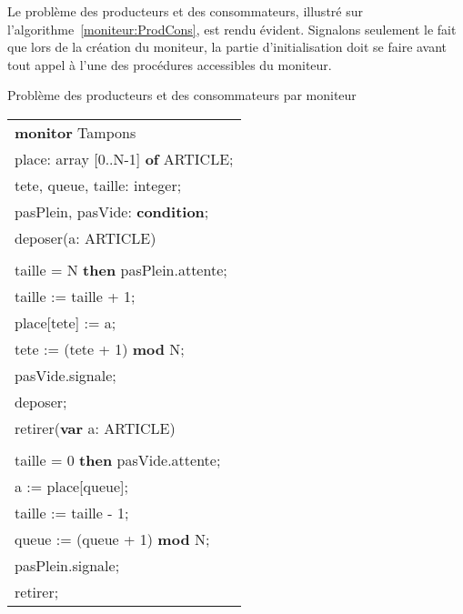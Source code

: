 \par
Le problème des producteurs et des consommateurs, illustré sur l'algorithme~\ref{moniteur:ProdCons}, est rendu évident. Signalons seulement le fait que lors de la création du moniteur, la partie d'initialisation doit se faire avant tout appel à l'une des procédures accessibles du moniteur.
\begin{algorithm}[!ht]
\caption{Problème des producteurs et des consommateurs par moniteur}\label{moniteur:ProdCons}
\begin{center}
\begin{tabular}{l}
{\bf monitor} Tampons \\
\hspace{0.3cm}{\bf var} place: array [0..N-1] {\bf of} ARTICLE; \\
\hspace{0.3cm}{\bf var} tete, queue, taille: integer; \\
\hspace{0.3cm}{\bf var} pasPlein, pasVide: {\bf condition}; \\

\hspace{0.3cm}{\bf entry procedure} deposer(a: ARTICLE) \\
\hspace{0.6cm}{\bf begin} \\
\hspace{1cm}{\bf if} taille = N {\bf then} pasPlein.attente; \\
\hspace{1cm}taille := taille + 1; \\
\hspace{1cm}place[tete] := a; \\
\hspace{1cm}tete := (tete + 1) {\bf mod} N; \\
\hspace{1cm}pasVide.signale; \\
\hspace{0.6cm}{\bf end} deposer; \\

\hspace{0.3cm}{\bf entry procedure} retirer({\bf var} a: ARTICLE) \\
\hspace{0.6cm}{\bf begin} \\
\hspace{1cm}{\bf if} taille = 0 {\bf then} pasVide.attente; \\
\hspace{1cm}a := place[queue]; \\
\hspace{1cm}taille := taille - 1; \\
\hspace{1cm}queue := (queue + 1) {\bf mod} N; \\
\hspace{1cm}pasPlein.signale; \\
\hspace{0.6cm}{\bf end} retirer; \\


\end{tabular}
\end{center}
\end{algorithm}
